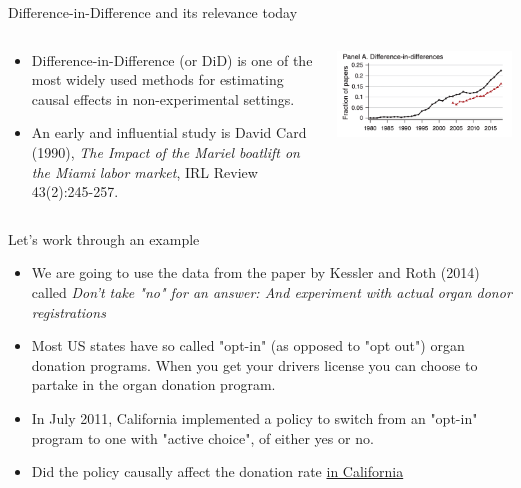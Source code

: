 \documentclass[notes,11pt, aspectratio=169]{beamer}
\begin{document}
\begin{frame}{Difference-in-Difference and its relevance today}
\begin{columns}
\begin{column}{0.5\textwidth}
  \begin{itemize}
        \item Difference-in-Difference (or DiD) is one of the most widely used methods for estimating causal effects in non-experimental settings. 

        \item An early and influential study is David Card (1990), \emph{The Impact of the Mariel boatlift on the Miami labor market}, IRL Review 43(2):245-257. 
    \end{itemize}
\end{column}

\begin{column}{0.5\textwidth}
 \begin{center}
        \includegraphics[width=1\linewidth]{24_DiDLecture/24_DiDLecture_AEA_DiD.png}
    \end{center}
\end{column}
\end{columns}

\end{frame}


\begin{frame}{Let's work through an example}
\begin{itemize}
    \item We are going to use the data from the paper by Kessler and Roth (2014) called \emph{Don't take "no" for an answer: And experiment with actual organ donor registrations} 

    \item Most US states have so called "opt-in" (as opposed to "opt out") organ donation programs. When you get your drivers license you can choose to partake in the organ donation program.

    \item In July 2011, California implemented a policy to switch from an "opt-in" program to one with "active choice", of either yes or no. 

    \item Did the policy causally affect the donation rate \underline{in California}
\end{itemize}
\end{frame}
\end{document}
